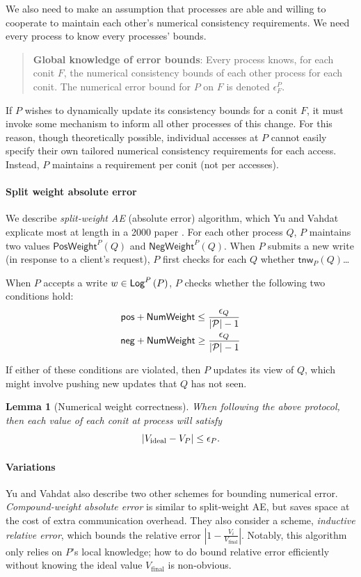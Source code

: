 \documentclass[]             %
{NASA}                       %
\newtheorem{lemma}[theorem]{Lemma}
\theoremstyle{definition}
\begin{document}
We also need to make an assumption that processes are able and willing
to cooperate to maintain each other's numerical consistency
requirements.  We need every process to know every processes' bounds.
\begin{quote}
  \textbf{Global knowledge of error bounds}: Every process knows, for
  each conit $F$, the numerical consistency bounds of each other
  process for each conit. The numerical error bound for $P$ on $F$ is
  denoted $\epsilon^P_F$.
\end{quote}
If $P$ wishes to dynamically update its consistency bounds for a conit
$F$, it must invoke some mechanism to inform all other processes of
this change. For this reason, though theoretically possible,
individual accesses at $P$ cannot easily specify their own tailored
numerical consistency requirements for each access. Instead, $P$
maintains a requirement per conit (not per accesses).

\paragraph{Split weight absolute error}
We describe \emph{split-weight AE} (absolute error) algorithm, which
Yu and Vahdat explicate most at length in a 2000 paper
\cite{2000tactalgorithms}. For each other process $Q$, $P$ maintains
two values $\mathsf{PosWeight}^{P}(Q)$ and
$\mathsf{NegWeight}^{P}(Q)$. When $P$ submits a new write (in response
to a client's request), $P$ first checks for each $Q$ whether
$\mathsf{tnw}_{P}(Q)$\ldots

When $P$ accepts a write $w \in \mathsf{Log}^{P}\left(P\right)$, $P$ checks whether the following two conditions hold:
\begin{gather*}
  \mathsf{pos} + \mathsf{NumWeight} \leq \frac{\epsilon_Q}{|\mathcal{P}| - 1} \\
  \mathsf{neg} + \mathsf{NumWeight} \geq \frac{\epsilon_Q}{|\mathcal{P}| - 1}
\end{gather*}

If either of these conditions are violated, then $P$ updates its view
of $Q$, which might involve pushing new updates that $Q$ has not seen.

\begin{lemma}[Numerical weight correctness]
  When following the above protocol, then each value of each conit at process will satisfy
  \[ | V_{\textrm{ideal}} - V_{P} | \leq \epsilon_{P}. \]
\end{lemma}


\paragraph{Variations} Yu and Vahdat also describe two other schemes
for bounding numerical error. \emph{Compound-weight absolute error} is
similar to split-weight AE, but saves space at the cost of extra
communication overhead. They also consider a scheme, \emph{inductive
  relative error}, which bounds the relative error
$|1 - \frac{V_i}{V_{\textrm{final}}}|$. Notably, this algorithm only
relies on $P$'s local knowledge; how to do bound relative error
efficiently without knowing the ideal value $V_{\textrm{final}}$ is
non-obvious.
\end{document}
